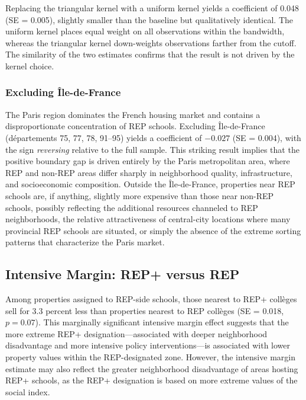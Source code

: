 \documentclass[12pt]{article}
\begin{document}
Replacing the triangular kernel with a uniform kernel yields a coefficient of 0.048 (SE = 0.005), slightly smaller than the baseline but qualitatively identical. The uniform kernel places equal weight on all observations within the bandwidth, whereas the triangular kernel down-weights observations farther from the cutoff. The similarity of the two estimates confirms that the result is not driven by the kernel choice.

\subsubsection{Excluding \^{I}le-de-France}

The Paris region dominates the French housing market and contains a disproportionate concentration of REP schools. Excluding \^{I}le-de-France (d\'{e}partements 75, 77, 78, 91--95) yields a coefficient of $-0.027$ (SE = 0.004), with the sign \textit{reversing} relative to the full sample. This striking result implies that the positive boundary gap is driven entirely by the Paris metropolitan area, where REP and non-REP areas differ sharply in neighborhood quality, infrastructure, and socioeconomic composition. Outside the \^{I}le-de-France, properties near REP schools are, if anything, slightly more expensive than those near non-REP schools, possibly reflecting the additional resources channeled to REP neighborhoods, the relative attractiveness of central-city locations where many provincial REP schools are situated, or simply the absence of the extreme sorting patterns that characterize the Paris market.

\subsection{Intensive Margin: REP+ versus REP}

Among properties assigned to REP-side schools, those nearest to REP+ coll\`{e}ges sell for 3.3 percent less than properties nearest to REP coll\`{e}ges (SE = 0.018, $p = 0.07$). This marginally significant intensive margin effect suggests that the more extreme REP+ designation---associated with deeper neighborhood disadvantage and more intensive policy interventions---is associated with lower property values within the REP-designated zone. However, the intensive margin estimate may also reflect the greater neighborhood disadvantage of areas hosting REP+ schools, as the REP+ designation is based on more extreme values of the social index.
\end{document}

